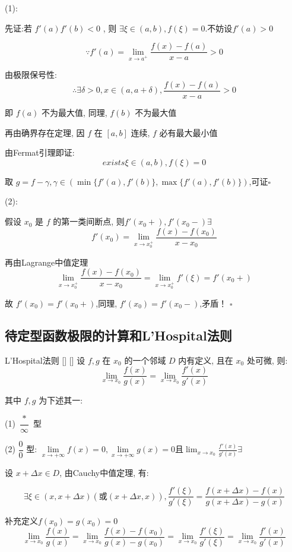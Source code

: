 \documentclass[UTF8]{ctexart}
\begin{document}
			\begin{prf}

				(1):

				先证:若 \(f'(a)f'(b)<0\) , 则 \(\exists\xi\in(a,b),f(\xi)=0\).不妨设\(f'(a)>0\)

				\[\because f'(a)=\lim\limits_{x\to a^+}\frac{f(x)-f(a)}{x-a}>0\]

				由极限保号性: 
				\[\therefore \exists\delta>0,x\in(a,a+\delta),\frac{f(x)-f(a)}{x-a}>0\]

				即 \(f(a)\) 不为最大值, 同理,  \(f(b)\) 不为最大值

				再由确界存在定理, 因 \(f\) 在 \([a,b]\) 连续,  \(f\) 必有最大最小值

				由Fermat引理即证: 
				\[exists\xi\in(a,b),f(\xi)=0\]

				取 \(g=f-\gamma,\gamma\in(\min\{f'(a),f'(b)\},\max\{f'(a),f'(b)\})\),可证\(\square\)

				(2):
				
				假设 \(x_0\) 是 \(f\) 的第一类间断点, 则\(f'(x_0+),f'(x_0-)\exists\)
				\[f'(x_0)=\lim_{x\to x_0^+}\frac{f(x)-f(x_0)}{x-x_0}\]

				再由Lagrange中值定理
				\[\lim_{x\to x_0^+}\frac{f(x)-f(x_0)}{x-x_0}=\lim_{x\to x_0^+}f'(\xi)=f'(x_0+)\]

				故 \(f'(x_0)=f'(x_0+)\),同理,  \(f'(x_0)=f'(x_0-)\),矛盾！
				\(\square\)
			\end{prf}
		
		\subsection{待定型函数极限的计算和L'Hospital法则}
		
			\begin{thm}
			    []
			    {L'Hospital法则}
			    []
			    []
				设 \(f,g\) 在 \(x_0\) 的一个邻域 \(D\) 内有定义, 且在 \(x_0\) 处可微, 则: 
				\[\lim_{x\to x_0}\frac{f(x)}{g(x)}=\lim_{x\to x_0}\frac{f'(x)}{g'(x)}\]

				其中 \(f,g\) 为下述其一:
				
				(1) \(\dfrac{*}{\infty}\) 型

				(2) \(\dfrac{0}{0}\) 型: 
				\(\lim\limits_{x\to+\infty}f(x)=0,\lim\limits_{x\to+\infty}g(x)=0\)且\(\lim_{x\to x_0}\frac{f'(x)}{g'(x)}\exists\)
				
			\end{thm}

			\begin{prf}
				
				设 \(x+\Delta x\in D\), 由Cauchy中值定理, 有: 

				\[\exists\xi\in(x,x+\Delta x)(\text{或}(x+\Delta x,x)),\frac{f'(\xi)}{g'(\xi)}=\frac{f(x+\Delta x)-f(x)}{g(x+\Delta x)-g(x)}\]

				补充定义\(f(x_0)=g(x_0)=0\)
				\[\lim_{x\to x_0}\frac{f(x)}{g(x)}=\lim_{x\to x_0}\frac{f(x)-f(x_0)}{g(x)-g(x_0)}=\lim_{x\to x_0}\frac{f'(\xi)}{g'(\xi)}=\lim_{x\to x_0}\frac{f'(x)}{g'(x)}\]

			\end{prf}
\end{document}
